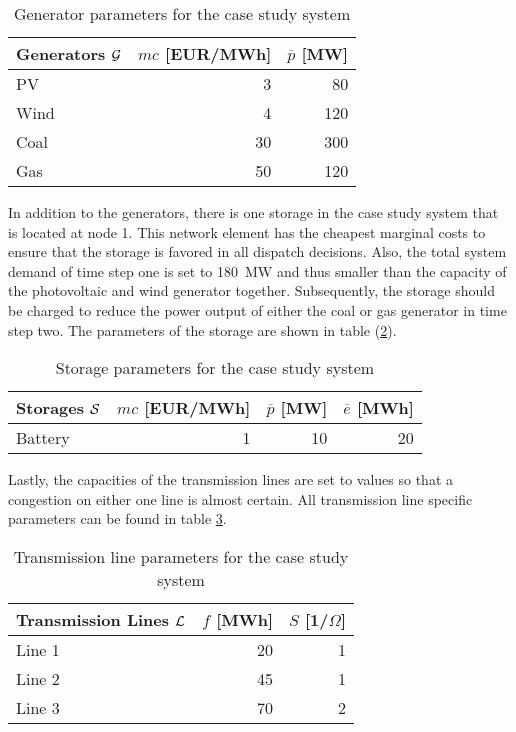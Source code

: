\begin{table}[h!]
    \centering
    \begin{tabular}{lrr}
        Generators $\mathcal{G}$ & $mc$ [EUR/MWh] & $\overline{p}$ [MW] \\ \toprule
        PV & 3 & 80 \\
        Wind & 4 & 120 \\
        Coal & 30 & 300 \\
        Gas & 50 & 120 \\
        \bottomrule
    \end{tabular}
    \caption{Generator parameters for the case study system} \label{tab:res:param-gen}
\end{table}

In addition to the generators, there is one storage in the case study system that is located at node 1. This network element has the cheapest marginal costs to ensure that the storage is favored in all dispatch decisions. Also, the total system demand of time step one is set to \SI{180}{\mega\watt} and thus smaller than the capacity of the photovoltaic and wind generator together. Subsequently, the storage should be charged to reduce the power output of either the coal or gas generator in time step two. The parameters of the storage are shown in table (\ref{tab:res:param-stor}).


 \begin{table}[h!]
    \centering
    \begin{tabular}{lrrr}
        Storages $\mathcal{S}$ & $mc$ [EUR/MWh] & $\overline{p}$ [MW] & $\overline{e}$ [MWh] \\ \toprule
        Battery & 1 & 10 & 20 \\
        \bottomrule
    \end{tabular}
    \caption{Storage parameters for the case study system} \label{tab:res:param-stor}
\end{table}

Lastly, the capacities of the transmission lines are set to values so that a congestion on either one line is almost certain. All transmission line specific parameters can be found in table \ref{tab:res:param-line}.

 \begin{table}[h!]
    \centering
    \begin{tabular}{lrr}
        Transmission Lines $\mathcal{L}$ & $f$ [MWh] & $S$ [1/$\Omega$] \\ \toprule
        Line 1 & 20 & 1 \\
        Line 2 & 45 & 1 \\
        Line 3 & 70 & 2 \\
        \bottomrule
    \end{tabular}
    \caption{Transmission line parameters for the case study system}
    \label{tab:res:param-line}
\end{table}

